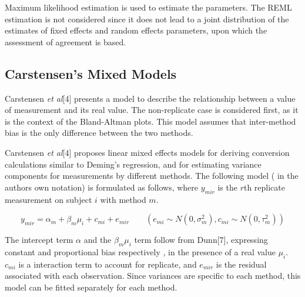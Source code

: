 \documentclass[12pt, a4paper]{report}
\theoremstyle{plain}
\theoremstyle{definition}
\theoremstyle{remark}
\begin{document}
	
	
	
	
	
	Maximum likelihood estimation is used to estimate the parameters.
	The REML estimation is not considered since it does not lead to a
	joint distribution of the estimates of fixed effects and random
	effects parameters, upon which the assessment of agreement is
	based.
	
	
	
	\subsection{Carstensen's Mixed Models}
	
	
	Carstensen \textit{et al}[4] presents a model to describe the relationship between a value of measurement and its real value.
	The non-replicate case is considered first, as it is the context of the Bland-Altman plots.
	This model assumes that inter-method bias is the only difference between the two methods.
	
	Carstensen \textit{et al}[4] proposes linear mixed effects models for deriving
	conversion calculations similar to Deming's regression, and for
	estimating variance components for measurements by different
	methods. The following model ( in the authors own notation) is
	formulated as follows, where $y_{mir}$ is the $r$th replicate
	measurement on subject $i$ with method $m$.
	
	\begin{equation}
	y_{mir}  = \alpha_{m} + \beta_{m}\mu_{i} + c_{mi} + e_{mir} \qquad
	( e_{mi} \sim N(0,\sigma^{2}_{m}), c_{mi} \sim N(0,\tau^{2}_{m}))
	\end{equation}
	
	The intercept term $\alpha$ and the $\beta_{m}\mu_{i}$ term follow
	from Dunn[7], expressing constant and proportional bias
	respectively , in the presence of a real value $\mu_{i}.$
	$c_{mi}$ is a interaction term to account for replicate, and
	$e_{mir}$ is the residual associated with each observation.
	Since variances are specific to each method, this model can be
	fitted separately for each method.
	
\end{document}
